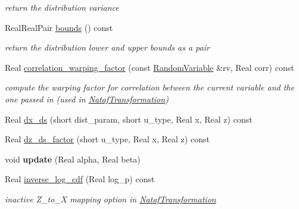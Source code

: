 \begin{DoxyCompactItemize}
\begin{DoxyCompactList}\small\item\em return the distribution variance \end{DoxyCompactList}\item 
Real\+Real\+Pair \hyperlink{classPecos_1_1FrechetRandomVariable_a4bdb95a8fa5fffaa0de5102f56963cf2}{bounds} () const \label{classPecos_1_1FrechetRandomVariable_a4bdb95a8fa5fffaa0de5102f56963cf2}

\begin{DoxyCompactList}\small\item\em return the distribution lower and upper bounds as a pair \end{DoxyCompactList}\item 
Real \hyperlink{classPecos_1_1FrechetRandomVariable_a9ee48b3ca93459136b2e73f77873c4aa}{correlation\+\_\+warping\+\_\+factor} (const \hyperlink{classPecos_1_1RandomVariable}{Random\+Variable} \&rv, Real corr) const \label{classPecos_1_1FrechetRandomVariable_a9ee48b3ca93459136b2e73f77873c4aa}

\begin{DoxyCompactList}\small\item\em compute the warping factor for correlation between the current variable and the one passed in (used in \hyperlink{classPecos_1_1NatafTransformation}{Nataf\+Transformation}) \end{DoxyCompactList}\item 
Real \hyperlink{classPecos_1_1FrechetRandomVariable_af889af8adfb262c9b74f573b2a9ffc99}{dx\+\_\+ds} (short dist\+\_\+param, short u\+\_\+type, Real x, Real z) const 
\item 
Real \hyperlink{classPecos_1_1FrechetRandomVariable_af6b5fc528523180bed5fc3008dcea205}{dz\+\_\+ds\+\_\+factor} (short u\+\_\+type, Real x, Real z) const 
\item 
void {\bfseries update} (Real alpha, Real beta)\label{classPecos_1_1FrechetRandomVariable_aaa82eccfdca4d440a4e2d4a890b0d9ed}

\item 
Real \hyperlink{classPecos_1_1FrechetRandomVariable_a065b031fb613138ede20895562efc61f}{inverse\+\_\+log\+\_\+cdf} (Real log\+\_\+p) const \label{classPecos_1_1FrechetRandomVariable_a065b031fb613138ede20895562efc61f}

\begin{DoxyCompactList}\small\item\em inactive Z\+\_\+to\+\_\+X mapping option in \hyperlink{classPecos_1_1NatafTransformation}{Nataf\+Transformation} \end{DoxyCompactList}\end{DoxyCompactItemize}

